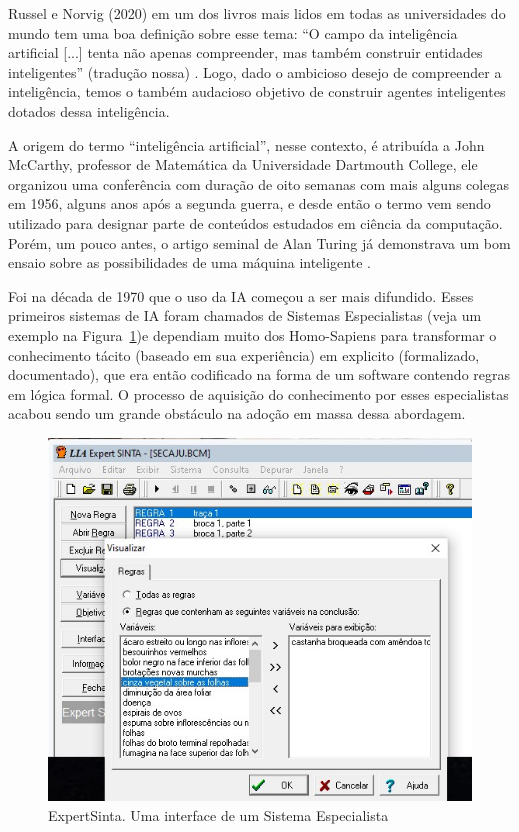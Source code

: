 \documentclass[a4paper,12pt]{book}
\begin{document}
	Russel e Norvig (2020) em um dos livros mais lidos em todas as universidades do mundo tem uma boa definição sobre esse tema: ``O campo da inteligência artificial [...] tenta não apenas compreender, mas também construir entidades inteligentes'' (tradução nossa) \cite{norvig2002}. Logo, dado o ambicioso desejo de compreender a inteligência, temos o também audacioso objetivo de construir agentes inteligentes dotados dessa inteligência.

	A origem do termo ``inteligência artificial'', nesse contexto, é atribuída a John McCarthy, professor de Matemática da Universidade Dartmouth College\cite{blipblog}, ele organizou uma conferência com duração de oito semanas com mais alguns colegas em 1956, alguns anos após a segunda guerra, e desde então o termo vem sendo utilizado para designar parte de conteúdos estudados em ciência da computação. Porém, um pouco antes, o artigo seminal de Alan Turing já demonstrava um bom ensaio sobre as possibilidades de uma máquina inteligente \cite{Turing1950}.

	Foi na década de 1970 que o uso da IA começou a ser mais difundido. Esses primeiros sistemas de IA foram chamados de Sistemas Especialistas (veja um exemplo na Figura~\ref{fig:expert})e dependiam muito dos Homo-Sapiens para transformar o conhecimento tácito (baseado em sua experiência) em explicito (formalizado, documentado), que era então codificado na forma de um software contendo regras em lógica formal. O processo de aquisição do conhecimento por esses especialistas acabou sendo um grande obstáculo na adoção em massa dessa abordagem.

	\begin{figure}
		\centering
		\includegraphics[width=0.7\linewidth]{figuras/expert}
		\caption{ExpertSinta. Uma interface de um Sistema Especialista}
		\label{fig:expert}
	\end{figure}
\end{document}
